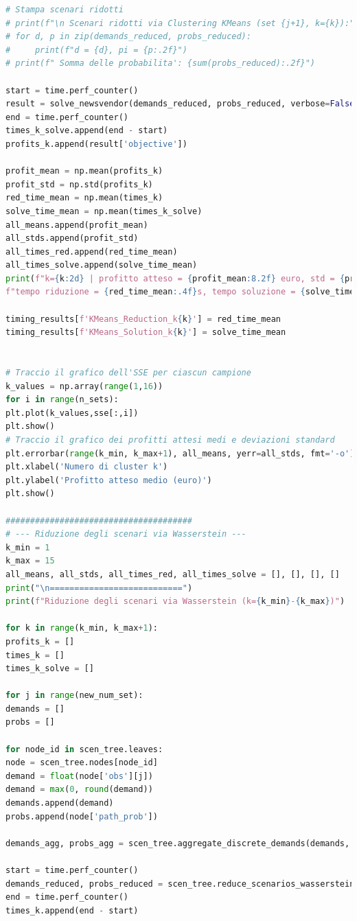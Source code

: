 \documentclass[a4paper,12pt]{article}
\begin{document}
\begin{lstlisting}[language=python,caption={Main of Newvendor problem},label={lst:main-nv}]
# Stampa scenari ridotti 
# print(f"\n Scenari ridotti via Clustering KMeans (set {j+1}, k={k}):")
# for d, p in zip(demands_reduced, probs_reduced):
#     print(f"d = {d}, pi = {p:.2f}")
# print(f" Somma delle probabilita': {sum(probs_reduced):.2f}")

start = time.perf_counter()
result = solve_newsvendor(demands_reduced, probs_reduced, verbose=False)
end = time.perf_counter()
times_k_solve.append(end - start)
profits_k.append(result['objective'])

profit_mean = np.mean(profits_k)
profit_std = np.std(profits_k)    
red_time_mean = np.mean(times_k)
solve_time_mean = np.mean(times_k_solve)
all_means.append(profit_mean)
all_stds.append(profit_std)
all_times_red.append(red_time_mean)
all_times_solve.append(solve_time_mean)
print(f"k={k:2d} | profitto atteso = {profit_mean:8.2f} euro, std = {profit_std:6.2f} euro, "
f"tempo riduzione = {red_time_mean:.4f}s, tempo soluzione = {solve_time_mean:.4f}s")

timing_results[f'KMeans_Reduction_k{k}'] = red_time_mean
timing_results[f'KMeans_Solution_k{k}'] = solve_time_mean


# Traccio il grafico dell'SSE per ciascun campione
k_values = np.array(range(1,16))
for i in range(n_sets):
plt.plot(k_values,sse[:,i])
plt.show()
# Traccio il grafico dei profitti attesi medi e deviazioni standard
plt.errorbar(range(k_min, k_max+1), all_means, yerr=all_stds, fmt='-o')
plt.xlabel('Numero di cluster k')
plt.ylabel('Profitto atteso medio (euro)')
plt.show()

######################################
# --- Riduzione degli scenari via Wasserstein ---
k_min = 1
k_max = 15
all_means, all_stds, all_times_red, all_times_solve = [], [], [], []
print("\n===========================")
print(f"Riduzione degli scenari via Wasserstein (k={k_min}-{k_max})")

for k in range(k_min, k_max+1):
profits_k = []
times_k = []
times_k_solve = []

for j in range(new_num_set):
demands = []
probs = []

for node_id in scen_tree.leaves:
node = scen_tree.nodes[node_id]
demand = float(node['obs'][j])
demand = max(0, round(demand))
demands.append(demand)
probs.append(node['path_prob'])

demands_agg, probs_agg = scen_tree.aggregate_discrete_demands(demands, probs)

start = time.perf_counter()
demands_reduced, probs_reduced = scen_tree.reduce_scenarios_wasserstein_1D(demands_agg, probs_agg, k=k)
end = time.perf_counter()
times_k.append(end - start)


\end{lstlisting}
\end{document}
